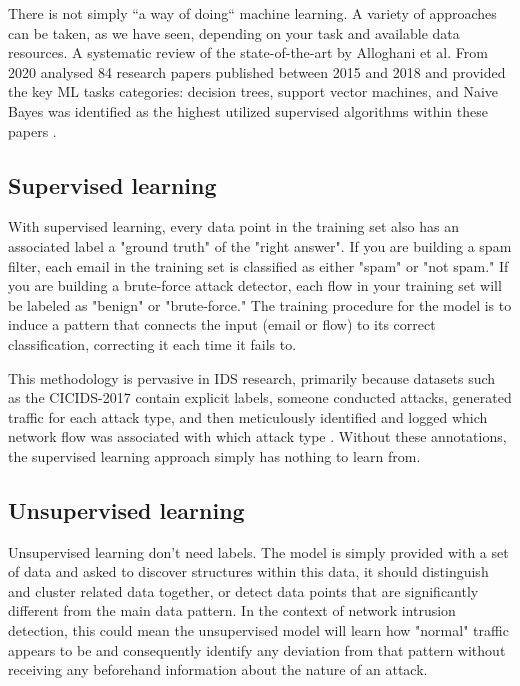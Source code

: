 There is not simply “a way of doing“ machine learning. A variety of approaches can be taken, as we have seen, depending on your task and available data resources. A systematic review of the state-of-the-art by Alloghani et al. From 2020 analysed 84 research papers published between 2015 and 2018 and provided the key ML tasks categories: decision trees, support vector machines, and Naive Bayes was identified as the highest utilized supervised algorithms within these papers \cite{alloghani2020systematic}.

\subsection{Supervised learning}

With supervised learning, every data point in the training set also has an associated label a "ground truth" of the "right answer". If you are building a spam filter, each email in the training set is classified as either "spam" or "not spam." If you are building a brute-force attack detector, each flow in your training set will be labeled as "benign" or "brute-force." The training procedure for the model is to induce a pattern that connects the input (email or flow) to its correct classification, correcting it each time it fails to.

This methodology is pervasive in IDS research, primarily because datasets such as the CICIDS-2017 contain explicit labels, someone conducted attacks, generated traffic for each attack type, and then meticulously identified and logged which network flow was associated with which attack type \cite{sharafaldin2018cicids}. Without these annotations, the supervised learning approach simply has nothing to learn from.

\subsection{Unsupervised learning}
Unsupervised learning don't need labels. The model is simply provided with a set of data and asked to discover structures within this data, it should distinguish and cluster related data together, or detect data points that are significantly different from the main data pattern. In the context of network intrusion detection, this could mean the unsupervised model will learn how "normal" traffic appears to be and consequently identify any deviation from that pattern without receiving any beforehand information about the nature of an attack. 

